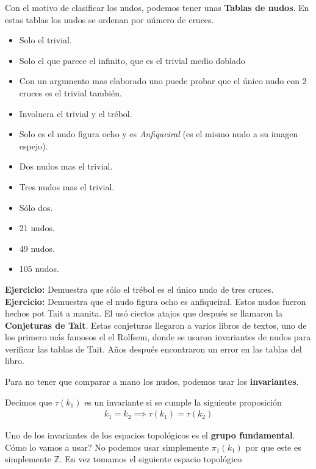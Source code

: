 \documentclass{article}
\theoremstyle{mytheoremstyle}
\theoremstyle{mytheoremstyle}
\theoremstyle{myproblemstyle}
\begin{document}
    Con el motivo de clasificar los nudos, podemos tener unas \textbf{Tablas de nudos}. En estas tablas los nudos se ordenan por número de cruces.
    \begin{itemize}
      \item[0 Cruces:] Solo el trivial.
      \item[1 Cruces:] Solo el que parece el infinito, que es el trivial medio doblado 
      \item [2 Cruces:] Con un argumento mas elaborado uno puede probar que el único nudo con 2 cruces es el trivial también.
      \item [3 Cruces:] Involucra el trivial y el trébol.
      \item [4 Cruces:] Solo es el nudo figura ocho y es \textit{Anfiqueiral} (es el mismo nudo a su imagen espejo).
      \item [5 Cruces:] Dos nudos mas el trivial. 
      \item [6 Cruces:] Tres nudos mas el trivial. 
      \item [7 Cruces:] Sólo dos.
      \item [8 Cruces:] 21 nudos.
      \item [9 Cruces:] 49 nudos.
      \item [10 Cruces:] 105 nudos.
    \end{itemize}
    \textbf{Ejercicio: } Demuestra que sólo el trébol es el único nudo de tres cruces. 
    \textbf{Ejercicio: } Demuestra que el nudo figura ocho es anfiqueiral. 
    Estos nudos fueron hechos pot Tait a manita. El usó ciertos atajos que después se llamaron la \textbf{Conjeturas de Tait}. Estas conjeturas llegaron a varios libros de textos, uno de los primero más famosos el el Rolfsem, donde se usaron invariantes de nudos para verificar las tablas de Tait. Años después encontraron un error en las tablas del libro. 

    Para no tener que comparar a mano los nudos, podemos usar los \textbf{invariantes}. 
    \begin{definition}
      Decimos que $\tau(k_1)$ es un invariante si se cumple la siguiente proposición
      \begin{align*}
        k_1=k_2\implies \tau(k_1)= \tau(k_2)
      \end{align*}
    \end{definition}

    Uno de los invariantes de los espacios topológicos es el \textbf{grupo fundamental}. Cómo lo vamos a usar? No podemos usar simplemente $\pi_1(k_1)$ por que este es simplemente $\mathbb{Z}$. En vez tomamos el siguiente espacio topológico 
   
\end{document}
